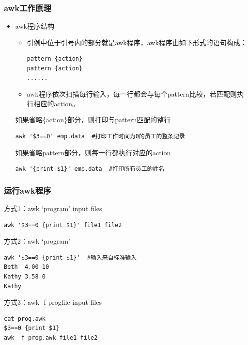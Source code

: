 \documentclass[xcolor=svgnames,presentation]{beamer}
\begin{document}
\begin{frame}[fragile]
\frametitle{awk工作原理}
\label{sec-2-2-3}
\begin{itemize}

\item awk程序结构
\label{sec-2-2-3-1}%
\begin{itemize}

\item 引例中位于引号内的部分就是awk程序，awk程序由如下形式的语句构成：\\
\label{sec-2-2-3-1-1}%
\begin{verbatim}
pattern {action}
pattern {action}
......
\end{verbatim}

\item awk程序依次扫描每行输入，每一行都会与每个pattern比较，若匹配则执行相应的action。
\label{sec-2-2-3-1-2}%
\end{itemize} %
\begin{exampleblock}{如果省略\{action\}部分，则打印与pattern匹配的整行}
\label{sec-2-2-3-1-3}


\begin{verbatim}
awk '$3==0' emp.data  #打印工作时间为0的员工的整条记录
\end{verbatim}
\end{exampleblock}
\begin{block}{如果省略pattern部分，则每一行都执行对应的action}
\label{sec-2-2-3-1-4}


\begin{verbatim}
awk '{print $1}' emp.data  #打印所有员工的姓名
\end{verbatim}
\end{block}
\end{itemize} %
\end{frame}
\begin{frame}[fragile]
\frametitle{运行awk程序}
\label{sec-2-2-4}
\begin{exampleblock}{方式1：awk `program' input files}
\label{sec-2-2-4-1}


\begin{verbatim}
awk '$3==0 {print $1}' file1 file2
\end{verbatim}
\end{exampleblock}
\begin{block}{方式2：awk `program'}
\label{sec-2-2-4-2}


\begin{verbatim}
awk '$3==0 {print $1}'  #输入来自标准输入
Beth  4.00 10
Kathy 3.58 0
Kathy
\end{verbatim}
\end{block}
\begin{exampleblock}{方式3：awk -f progfile input files}
\label{sec-2-2-4-3}


\begin{verbatim}
cat prog.awk
$3==0 {print $1}
awk -f prog.awk file1 file2
\end{verbatim}
\end{exampleblock}
\end{frame}
\end{document}
